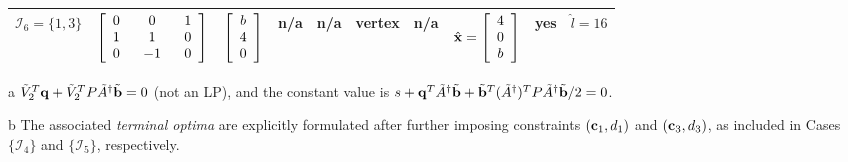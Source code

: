 \documentclass{imaman}
\newcommand{\bfb}{{\bf b}}
\newcommand{\bfc}{{\bf c}}
\newcommand{\bfx}{{\bf x}}
\newcommand{\bfq}{{\bf q}}
\newcommand{\calI}{{\mathcal I}}
\numberwithin{equation}{section}
\begin{document}
\begin{landscape}
\begin{table}[htbp]
\begin{threeparttable}[htbp]
\begin{tabular}{l l l l l l l l l l}
$\calI_6=\{1,3\}$ & \hspace{-0.1cm}$\left[ \renewcommand{\arraystretch}{1} \begin{array}{ccc} 0 & ~~0~~ & 1 \\ 1 & ~~1~~ & 0 \\ 0 & ~~{-1}~~ & 0 \end{array}\right]$ & \hspace{-0.3cm}$\left[ \renewcommand{\arraystretch}{1} \begin{array}{c} b\\ 4\\ 0\end{array}\right]$ & \hspace{-0.15cm}n/a & \hspace{-0.2cm}n/a & \hspace{-0.1cm}vertex & \hspace{-0.1cm}n/a & \hspace{-0.1cm}$\hat\bfx=\left[ \renewcommand{\arraystretch}{1} \begin{array}{c} 4\\ 0\\ b\end{array}\right]$ & \hspace{-0.1cm}yes & \hspace{-0.1cm}$\hat l=16$ \vspace{0.2cm} \\
\hline
\end{tabular}
\begin{tablenotes}
\item [a] $\tilde V_2^T\bfq+\tilde V_2^TP\tilde A^\dagger\tilde \bfb=0$ (not an LP), and the constant value is $s+\bfq^T\tilde A^\dagger\tilde\bfb+\tilde\bfb^T(\tilde A^\dagger)^TP\tilde A^\dagger\tilde\bfb/2=0$.
\item [b] The associated \textit{terminal optima} are explicitly formulated after further imposing constraints $(\bfc_1,d_1)$ and $(\bfc_3,d_3)$, as included in  Cases $\{\calI_4\}$ and $\{\calI_5\}$, respectively.
\end{tablenotes}
\label{Table_Ex_QP_Singular}
\end{threeparttable}
\end{table}
\end{landscape}



\end{document}
